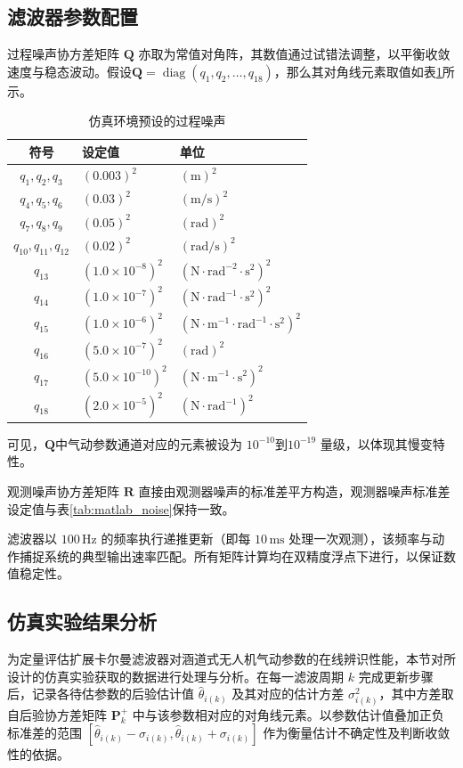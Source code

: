 \subsection{滤波器参数配置}
过程噪声协方差矩阵 $\bm{Q}$ 亦取为常值对角阵，其数值通过试错法调整，以平衡收敛速度与稳态波动。假设$\bm{Q} = \operatorname{diag}(q_1, q_2, \dots, q_{18})$，那么其对角线元素取值如表\ref{tab:Q_set}所示。
\begin{table}[htbp]
    \centering
    \caption{仿真环境预设的过程噪声}
    \label{tab:Q_set}
    \begin{tabular}{cll}
    \toprule
    符号 & 设定值 & 单位 \\
    \midrule
    $q_1,q_2,q_3$ & $(0.003)^2$ & $\mathrm{(m)^2}$ \\
    $q_4,q_5,q_6$ & $(0.03)^2$ & $\mathrm{(m/s)^2}$ \\
    $q_7,q_8,q_9$ & $(0.05)^2$ & $\mathrm{(rad)^2}$ \\
    $q_{10},q_{11},q_{12}$ & $(0.02)^2$ & $\mathrm{(rad/s)^2}$ \\
    $q_{13}$ & $(1.0 \times 10^{-8})^2$ & $\mathrm{(N \cdot rad ^{-2} \cdot s^2)^2}$\\
    $q_{14}$ & $(1.0 \times 10^{-7})^2$ & $\mathrm{(N \cdot rad ^{-1} \cdot s^2)^2}$\\
    $q_{15}$ & $(1.0 \times 10^{-6})^2$ & $\mathrm{(N \cdot m^{-1} \cdot rad ^{-1} \cdot s^2)^2}$\\
    $q_{16}$ & $(5.0 \times 10^{-7})^2$ & $\mathrm{(rad)^2}$\\
    $q_{17}$ & $(5.0 \times 10^{-10})^2$ & $\mathrm{(N \cdot m^{-1} \cdot s^2)^2}$\\
    $q_{18}$ & $(2.0 \times 10^{-5})^2$ & $\mathrm{(N \cdot rad^{-1})^2}$\\
    \bottomrule
    \end{tabular}
\end{table}
可见，$\bm{Q}$中气动参数通道对应的元素被设为 $10^{-10}$到$10^{-19}$ 量级，以体现其慢变特性。

观测噪声协方差矩阵 $\bm{R}$ 直接由观测器噪声的标准差平方构造，观测器噪声标准差设定值与表\ref{tab:matlab_noise}保持一致。

滤波器以 $100\,\mathrm{Hz}$ 的频率执行递推更新（即每 $10\,\mathrm{ms}$ 处理一次观测），该频率与动作捕捉系统的典型输出速率匹配。所有矩阵计算均在双精度浮点下进行，以保证数值稳定性。

\subsection{仿真实验结果分析}
为定量评估扩展卡尔曼滤波器对涵道式无人机气动参数的在线辨识性能，本节对所设计的仿真实验获取的数据进行处理与分析。在每一滤波周期 \(k\) 完成更新步骤后，记录各待估参数的后验估计值 \(\hat{\theta}_{i(k)}\) 及其对应的估计方差 \(\sigma_{i(k)}^2\)，其中方差取自后验协方差矩阵 \(\bm{P}_k^+\) 中与该参数相对应的对角线元素。以参数估计值叠加正负标准差的范围 \(\left[\hat{\theta}_{i(k)} - \sigma_{i(k)}, \hat{\theta}_{i(k)} + \sigma_{i(k)}\right]\) 作为衡量估计不确定性及判断收敛性的依据。

